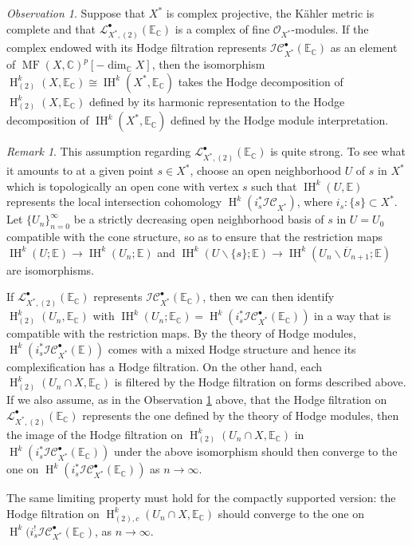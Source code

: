 \documentclass[12pt,letterpaper]{amsart}
\numberwithin{equation}{section}
\def\CC{{\mathbb C}}
\def\EE{{\mathbb E}}
\def\ssm{\smallsetminus}
\def\Iscr{{\mathscr I}}
\def\Lscr{{\mathscr L}}
\def\Ocal{{\mathcal O}}
\def\Cscr{{\mathscr C}}
\def\pt{{\scriptscriptstyle\bullet}}
\newcommand\Hl{\operatorname{H}}
\newcommand\IH{\operatorname{IH}}
\newcommand\MF{\operatorname{MF}}
\theoremstyle{remark}
\newtheorem{observation}[theorem]{Observation}
\newtheorem{remark}[theorem]{Remark}
\begin{document}
\begin{observation}\label{obs}
Suppose that ${X^*}$ is complex projective,  the K\"ahler metric is complete and that  $\Lscr^\pt_{{X^*},(2)}(\EE_\CC)$ 
is a complex of fine $\Ocal_{X^*}$-modules.
If the complex endowed with its Hodge filtration represents  $\Iscr\Cscr_{X^*}^\pt(\EE_\CC)$ as an element of 
$\MF(X, \CC)^p[-\dim_\CC X]$, then  the isomorphism $\Hl^k_{(2)}(X, \EE_\CC)\cong \IH^k({X^*}, \EE_\CC)$ takes the 
Hodge decomposition of $\Hl^k_{(2)}(X, \EE_\CC)$ defined by its harmonic representation  to the Hodge 
decomposition of $\IH^k({X^*}, \EE_\CC)$  defined by the Hodge module interpretation.
\end{observation}

\begin{remark}\label{rem:concrete}
This assumption regarding $\Lscr^\pt_{{X^*},(2)}(\EE_\CC)$ is quite strong. To see what it amounts to at a given point  $s\in X^*$, 
choose an open neighborhood $U$ of $s$ in $X^*$  which is  topologically an open cone with vertex $s$ such that $\IH^k(U,\EE)$ represents the 
 local intersection cohomology $\Hl^k(i_s^*\Iscr\Cscr_{X^*})$, where $i_s: \{s\}\subset X^*$. 
 Let  $\{ U_n\}_{n=0}^\infty$ be a strictly decreasing   open neighborhood basis of $s$ in $U=U_0$  
 compatible with the cone structure, so as to 
ensure that  the  restriction maps $\IH^k(U; \EE)\to \IH^k(U_n; \EE)$  and 
$\IH^k(U\ssm \{s\}; \EE)\to \IH^k(U_n\ssm \overline U_{n+1}; \EE)$
are isomorphisms.  

If $\Lscr^\pt_{{X^*},(2)}(\EE_\CC)$ represents $\Iscr\Cscr_{X^*}^\pt(\EE_\CC)$,  then we can then identify   $\Hl^k_{(2)} (U_n, \EE_\CC)$ with 
$\IH^k(U_n; \EE_\CC)=\Hl^k(i_s^*\Iscr\Cscr_{X^*}^\pt(\EE_\CC))$ in a way that is compatible with the restriction maps.  
By the  theory of Hodge modules, $\Hl^k(i_s^*\Iscr\Cscr_{X^*}^\pt(\EE))$ comes with a mixed Hodge structure and hence its 
complexification  has  a Hodge filtration. On the other hand, each $\Hl^k_{(2)} (U_n\cap X, \EE_\CC)$  is filtered by the  Hodge filtration on 
forms described above. If we also assume, as in the Observation \ref{obs} above, that the Hodge filtration on $\Lscr^\pt_{{X^*},(2)}(\EE_\CC)$ 
represents the one defined by the theory of Hodge modules, then the image of the Hodge filtration on  
$\Hl^k_{(2)} (U_n\cap X, \EE_\CC)$ in $ \Hl^k(i_s^*\Iscr\Cscr_{X^*}^\pt(\EE_\CC))$ under  the above isomorphism 
should then converge to the one on $\Hl^k(i_s^*\Iscr\Cscr_{X^*}^\pt(\EE_\CC))$ as $n\to\infty$.  

The same limiting  property must hold for the compactly supported version:  the Hodge  filtration on 
$\Hl^k_{(2),c} (U_n\cap X, \EE_\CC)$ should converge to the one on  $\Hl^k(i_s^!\Iscr\Cscr_{X^*}^\pt(\EE_\CC)$, as $n\to \infty$. 
 \end{remark}
\end{document}
